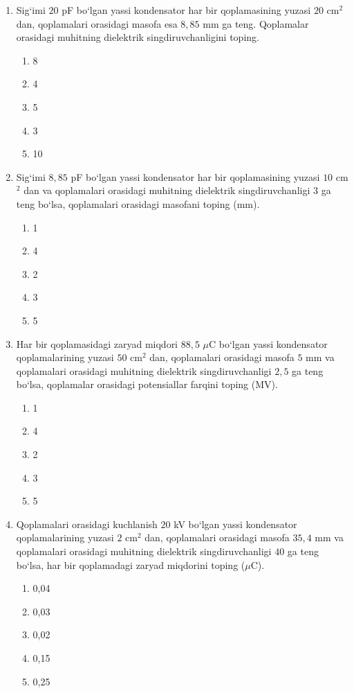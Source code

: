 \begin{enumerate}
\item Sig‘imi $20$ pF bo‘lgan yassi kondensator har bir qoplamasining yuzasi $20$ cm$^2$ dan, qoplamalari orasidagi masofa esa $8,85$ mm ga teng. Qoplamalar orasidagi muhitning dielektrik singdiruvchanligini toping.
\begin{enumerate}[label=\Alph*)]
\item 8
\item 4
\item 5
\item 3
\item 10
\end{enumerate}

\item Sig‘imi $8,85$ pF bo‘lgan yassi kondensator har bir qoplamasining yuzasi $10$ cm$^2$ dan va qoplamalari orasidagi muhitning dielektrik singdiruvchanligi $3$ ga teng bo‘lsa, qoplamalari orasidagi masofani toping (mm).
\begin{enumerate}[label=\Alph*)]
\item 1
\item 4
\item 2
\item 3
\item 5
\end{enumerate}

\item Har bir qoplamasidagi zaryad miqdori $88,5$ $\mu$C bo‘lgan yassi kondensator qoplamalarining yuzasi $50$ cm$^2$ dan, qoplamalari orasidagi masofa $5$ mm va qoplamalari orasidagi muhitning dielektrik singdiruvchanligi $2,5$ ga teng bo‘lsa, qoplamalar orasidagi potensiallar farqini toping (MV).
\begin{enumerate}[label=\Alph*)]
\item 1
\item 4
\item 2
\item 3
\item 5
\end{enumerate}

\item Qoplamalari orasidagi kuchlanish $20$ kV bo‘lgan yassi kondensator qoplamalarining yuzasi $2$ cm$^2$ dan, qoplamalari orasidagi masofa $35,4$ mm va qoplamalari orasidagi muhitning dielektrik singdiruvchanligi $40$ ga teng bo‘lsa, har bir qoplamadagi zaryad miqdorini toping ($\mu$C).
\begin{enumerate}[label=\Alph*)]
\item 0,04
\item 0,03
\item 0,02
\item 0,15
\item 0,25
\end{enumerate}


\end{enumerate}
